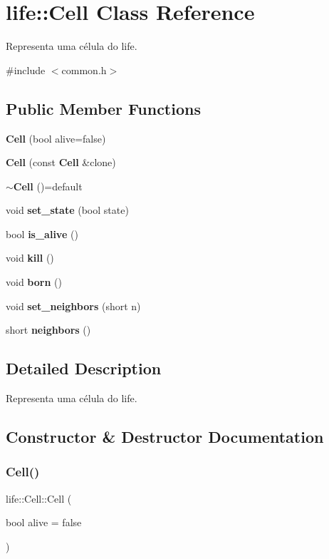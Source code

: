 \section{life\+:\+:Cell Class Reference}
\label{classlife_1_1_cell}


Representa uma célula do life.  




{\ttfamily \#include $<$common.\+h$>$}

\subsection*{Public Member Functions}
\begin{DoxyCompactItemize}
\item 
\textbf{ Cell} (bool alive=false)
\item 
\textbf{ Cell} (const \textbf{ Cell} \&clone)
\item 
\textbf{ $\sim$\+Cell} ()=default
\item 
void \textbf{ set\+\_\+state} (bool state)
\item 
bool \textbf{ is\+\_\+alive} ()
\item 
void \textbf{ kill} ()
\item 
void \textbf{ born} ()
\item 
void \textbf{ set\+\_\+neighbors} (short n)
\item 
short \textbf{ neighbors} ()
\end{DoxyCompactItemize}


\subsection{Detailed Description}
Representa uma célula do life. 

\subsection{Constructor \& Destructor Documentation}
\mbox{\label{classlife_1_1_cell_ad7fca63a990ce5bf6fee5a4500c65e06}} 
\subsubsection{Cell()\hspace{0.1cm}{\footnotesize\ttfamily [1/2]}}
{\footnotesize\ttfamily life\+::\+Cell\+::\+Cell (\begin{DoxyParamCaption}\item[{bool}]{alive = {\ttfamily false} }\end{DoxyParamCaption})\hspace{0.3cm}{\ttfamily [inline]}}

